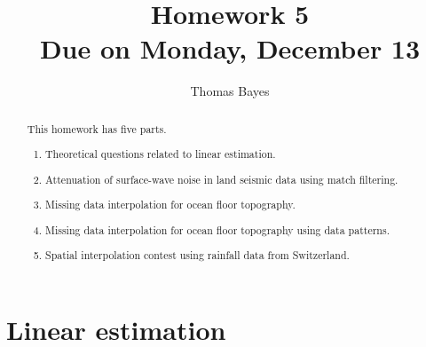 \author{Thomas Bayes}
\title{Homework 5 \\ Due on Monday, December 13}

\begin{abstract}
  This homework has five parts. 
  \begin{enumerate}
  \item Theoretical questions related to linear estimation.
  \item Attenuation of surface-wave noise in land 
    seismic data using match filtering.
  \item Missing data interpolation for ocean floor topography. 
  \item Missing data interpolation for ocean floor topography using data patterns. 
  \item Spatial interpolation contest using rainfall data from Switzerland.
  \end{enumerate}
\end{abstract}

\section{Linear estimation}

